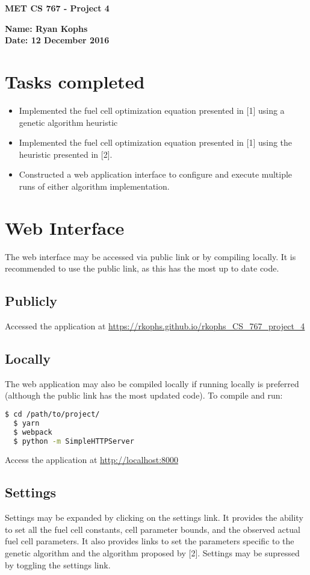 \documentclass{article}
\begin{document}
\begin{center}
\Large{\textbf{MET CS 767 - Project 4}}
\end{center}
\textbf{Name: Ryan Kophs} \\
\textbf{Date: 12 December 2016}

\section{Tasks completed}
\begin{itemize}
\item Implemented the fuel cell optimization equation presented in [1] using a genetic algorithm heuristic
\item Implemented the fuel cell optimization equation presented in [1] using the heuristic presented in [2].
\item Constructed a web application interface to configure and execute multiple runs of either algorithm implementation.
\end{itemize}

\section{Web Interface}
The web interface may be accessed via public link or by compiling locally. It is recommended to use the public link, as this has the most up to date code.
\subsection{Publicly}
Accessed the application at \url{https://rkophs.github.io/rkophs_CS_767_project_4}
\subsection{Locally}
The web application may also be compiled locally if running locally is preferred (although the public link has the most updated code). To compile and run:

\begin{lstlisting}[language=bash]
  $ cd /path/to/project/
  $ yarn
  $ webpack
  $ python -m SimpleHTTPServer
\end{lstlisting}

Access the application at \url{http://localhost:8000}

\subsection{Settings}
Settings may be expanded by clicking on the settings link. It provides the ability to set all the fuel cell constants, cell parameter bounds, and the observed actual fuel cell parameters. It also provides links to set the parameters specific to the genetic algorithm and the algorithm proposed by [2]. Settings may be supressed by toggling the settings link.
\end{document}
